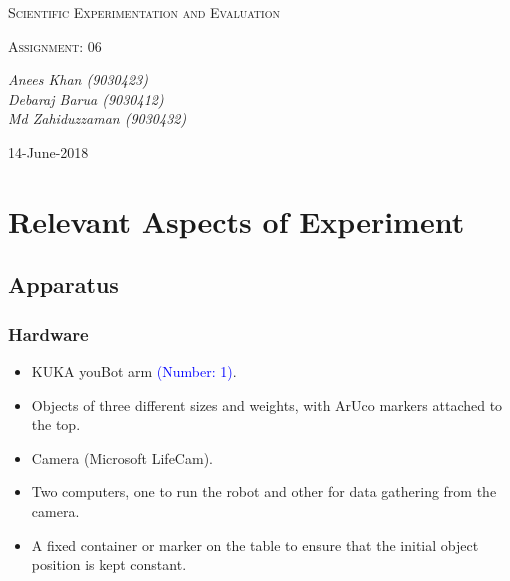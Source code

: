 \documentclass[10pt,a4paper]{article}
\begin{document}
				\begin{titlepage}
				\centering
			
					{\scshape\LARGE Scientific Experimentation and Evaluation\par}
			
					{\scshape\Large Assignment: 06\par}
			
					\vfill
			
					\vfill
					{\Large\itshape Anees Khan (9030423)
						\\Debaraj Barua (9030412)\\
						Md Zahiduzzaman (9030432)
						\par}
					\vfill
			
					{\large 14-June-2018\par}
				\end{titlepage}
				\tableofcontents
				\listoffigures	
				\listoftables
				\newpage
				\section{Relevant Aspects of Experiment}
				\subsection{Apparatus}
					\subsubsection{Hardware}
						\begin{itemize}
							\item KUKA youBot arm \textcolor{blue}{(Number: 1)}.
							\item Objects of three different sizes and weights, with ArUco markers attached to the top.
							\item Camera (Microsoft LifeCam).
							\item Two computers, one to run the robot and other for data gathering from the camera.
							\item A fixed container or marker on the table to ensure that the initial object position is kept constant.
						\end{itemize}
\end{document}
